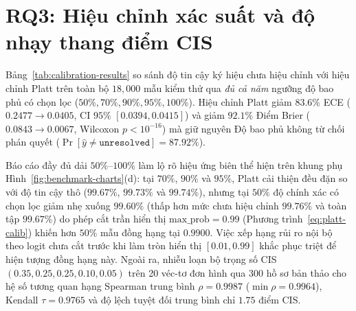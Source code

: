 \section{RQ3: Hiệu chỉnh xác suất và độ nhạy thang điểm CIS}

Bảng~\ref{tab:calibration-results} so sánh độ tin cậy ký hiệu chưa hiệu chỉnh với hiệu chỉnh Platt trên toàn bộ $18{,}000$ mẫu kiểm thử qua \emph{đủ cả năm} ngưỡng độ bao phủ có chọn lọc ($50\%, 70\%, 90\%, 95\%, 100\%$). Hiệu chỉnh Platt giảm $83.6\%$ ECE ($0.2477 \rightarrow \mathbf{0.0405}$, CI $95\%$ $[0.0394, 0.0415]$) và giảm $92.1\%$ Điểm Brier ($0.0843 \rightarrow \mathbf{0.0067}$, Wilcoxon $p < 10^{-16}$) mà giữ nguyên Độ bao phủ không từ chối phán quyết ($\Pr[\hat{y} \neq \texttt{unresolved}] = 87.92\%$).

Báo cáo đầy đủ dải $50\%$--$100\%$ làm lộ rõ hiệu ứng biên thể hiện trên khung phụ Hình~\ref{fig:benchmark-charts}(d): tại $70\%$, $90\%$ và $95\%$, Platt cải thiện đều đặn so với độ tin cậy thô ($99.67\%$, $99.73\%$ và $99.74\%$), nhưng tại $50\%$ độ chính xác có chọn lọc giảm nhẹ xuống $99.60\%$ (thấp hơn mức chưa hiệu chỉnh $99.76\%$ và toàn tập $99.67\%$) do phép cắt trần hiển thị $\text{max\_prob} = 0.99$ (Phương trình~\eqref{eq:platt-calib}) khiến hơn $50\%$ mẫu đồng hạng tại $0.9900$. Việc xếp hạng rủi ro nội bộ theo logit chưa cắt trước khi làm tròn hiển thị $[0.01, 0.99]$ khắc phục triệt để hiện tượng đồng hạng này. Ngoài ra, nhiễu loạn bộ trọng số CIS $(0.35, 0.25, 0.25, 0.10, 0.05)$ trên 20 véc-tơ đơn hình qua 300 hồ sơ bản thảo cho hệ số tương quan hạng Spearman trung bình $\rho = 0.9987$ ($\min \rho = 0.9964$), Kendall $\tau = 0.9765$ và độ lệch tuyệt đối trung bình chỉ $1.75$ điểm CIS.

